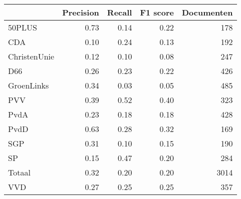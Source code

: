 \begin{tabular}{lrrrr}
\toprule
{} &  Precision &  Recall &  F1 score &  Documenten \\
\midrule
50PLUS       &       0.73 &    0.14 &      0.22 &         178 \\
CDA          &       0.10 &    0.24 &      0.13 &         192 \\
ChristenUnie &       0.12 &    0.10 &      0.08 &         247 \\
D66          &       0.26 &    0.23 &      0.22 &         426 \\
GroenLinks   &       0.34 &    0.03 &      0.05 &         485 \\
PVV          &       0.39 &    0.52 &      0.40 &         323 \\
PvdA         &       0.23 &    0.18 &      0.18 &         428 \\
PvdD         &       0.63 &    0.28 &      0.32 &         169 \\
SGP          &       0.31 &    0.10 &      0.15 &         190 \\
SP           &       0.15 &    0.47 &      0.20 &         284 \\
Totaal       &       0.32 &    0.20 &      0.20 &        3014 \\
VVD          &       0.27 &    0.25 &      0.25 &         357 \\
\bottomrule
\end{tabular}
